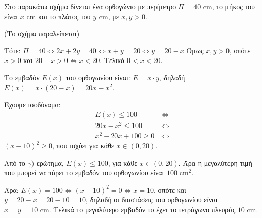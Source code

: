 
\begin{alist}
\item Στο παρακάτω σχήμα δίνεται ένα ορθογώνιο με περίμετρο $\Pi = 40 \text{ cm}$, το μήκος του είναι
$x \text{ cm}$ και το πλάτος του $y \text{ cm}$, με $x, y > 0$.

(Το σχήμα παραλείπεται)

Τότε: $\Pi = 40 \Leftrightarrow 2x + 2y = 40 \Leftrightarrow x + y = 20 \Leftrightarrow y = 20 - x$
Όμως $x, y > 0$, οπότε $x > 0$ και $20 - x > 0 \Leftrightarrow x < 20$. Τελικά $0 < x < 20$.

\item Το εμβαδόν $E(x)$ του ορθογωνίου είναι:
$E = x \cdot y$, δηλαδή $E(x) = x \cdot (20 - x) = 20x - x^2$.

\item Έχουμε ισοδύναμα:
\begin{align*}
E(x) \le 100 \ &\Leftrightarrow \\
20x - x^2 \le 100 \ &\Leftrightarrow \\
x^2 - 20x + 100 \ge 0 \ &\Leftrightarrow
\end{align*}
$(x - 10)^2 \ge 0$, που ισχύει για κάθε $x \in (0, 20)$.

\item Από το $\gamma)$ ερώτημα, $E(x) \le 100$, για κάθε $x \in (0, 20)$. Άρα η μεγαλύτερη τιμή που μπορεί
να πάρει το εμβαδόν του ορθογωνίου είναι $100 \text{ cm}^2$.

Άρα: $E(x) = 100 \Leftrightarrow (x - 10)^2 = 0 \Leftrightarrow x = 10$, οπότε και $y = 20 - x = 20 - 10 = 10$, δηλαδή οι
διαστάσεις του ορθογωνίου είναι $x = y = 10 \text{ cm}$. Τελικά το μεγαλύτερο εμβαδόν το έχει το
τετράγωνο πλευράς $10 \text{ cm}$.
\end{alist}


